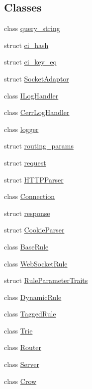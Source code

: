 \subsection*{Classes}
\begin{DoxyCompactItemize}
\item 
class \hyperlink{classcrow_1_1query__string}{query\-\_\-string}
\item 
struct \hyperlink{structcrow_1_1ci__hash}{ci\-\_\-hash}
\item 
struct \hyperlink{structcrow_1_1ci__key__eq}{ci\-\_\-key\-\_\-eq}
\item 
struct \hyperlink{structcrow_1_1_socket_adaptor}{Socket\-Adaptor}
\item 
class \hyperlink{classcrow_1_1_i_log_handler}{I\-Log\-Handler}
\item 
class \hyperlink{classcrow_1_1_cerr_log_handler}{Cerr\-Log\-Handler}
\item 
class \hyperlink{classcrow_1_1logger}{logger}
\item 
struct \hyperlink{structcrow_1_1routing__params}{routing\-\_\-params}
\item 
struct \hyperlink{structcrow_1_1request}{request}
\item 
struct \hyperlink{structcrow_1_1_h_t_t_p_parser}{H\-T\-T\-P\-Parser}
\item 
class \hyperlink{classcrow_1_1_connection}{Connection}
\item 
struct \hyperlink{structcrow_1_1response}{response}
\item 
struct \hyperlink{structcrow_1_1_cookie_parser}{Cookie\-Parser}
\item 
class \hyperlink{classcrow_1_1_base_rule}{Base\-Rule}
\item 
class \hyperlink{classcrow_1_1_web_socket_rule}{Web\-Socket\-Rule}
\item 
struct \hyperlink{structcrow_1_1_rule_parameter_traits}{Rule\-Parameter\-Traits}
\item 
class \hyperlink{classcrow_1_1_dynamic_rule}{Dynamic\-Rule}
\item 
class \hyperlink{classcrow_1_1_tagged_rule}{Tagged\-Rule}
\item 
class \hyperlink{classcrow_1_1_trie}{Trie}
\item 
class \hyperlink{classcrow_1_1_router}{Router}
\item 
class \hyperlink{classcrow_1_1_server}{Server}
\item 
class \hyperlink{classcrow_1_1_crow}{Crow}
\end{DoxyCompactItemize}
